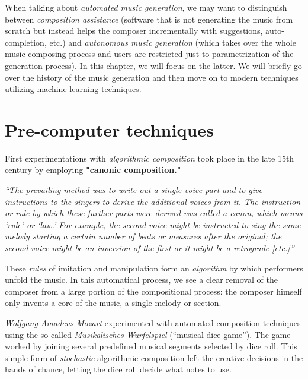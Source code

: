 
\begin{chapterabstract}
    When talking about \textit{automated music generation}, we may want to distinguish between \textit{composition assistance} (software that is not generating the music from scratch but instead helps the composer incrementally with suggestions, auto-completion, etc.) and \textit{autonomous music generation} (which takes over the whole music composing process and users are restricted just to parametrization of the generation process).
    In this chapter, we will focus on the latter.
    We will briefly go over the history of the music generation and then move on to modern techniques utilizing machine learning techniques.~\cite{music-generation-history}
\end{chapterabstract}


\section{Pre-computer techniques}\label{sec:pre-computer-techniques}

First experimentations with \textit{algorithmic composition} took place in the late 15th century by employing \textbf{"canonic composition."}~\cite{brief-history-of-algo-composition}

\textit{``The prevailing method was to write out a single voice part and to give instructions to the singers to derive the additional voices from it.
The instruction or rule by which these further parts were derived was called a canon, which means `rule' or `law.' For example, the second voice might be instructed to sing the same melody starting a certain number of beats or measures after the original;
the second voice might be an inversion of the first or it might be a retrograde [etc.]''}~\cite{history-of-western-music}

These \textit{rules} of imitation and manipulation form an \textit{algorithm} by which performers unfold the music.
In this automatical process, we see a clear removal of the composer from a large portion of the compositional process: the composer himself only invents a core of the music, a single melody or section.~\cite{brief-history-of-algo-composition}

\textit{Wolfgang Amadeus Mozart} experimented with automated composition techniques using the so-called \textit{Musikalisches Wurfelspiel} (``musical dice game'').
The game worked by joining several predefined musical segments selected by dice roll.
This simple form of \textit{stochastic} algorithmic composition left the creative decisions in the hands of chance, letting the dice roll decide what notes to use.~\cite{brief-history-of-algo-composition}


